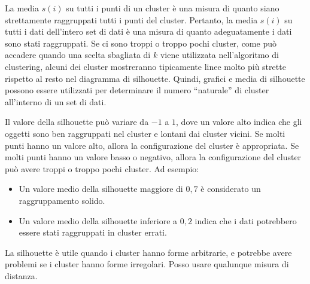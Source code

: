 La media $s(i)$ su tutti i punti di un cluster è una misura di quanto siano
strettamente raggruppati tutti i punti del cluster. Pertanto, la media $s(i)$ su
tutti i dati dell'intero set di dati è una misura di quanto adeguatamente i dati
sono stati raggruppati. Se ci sono troppi o troppo pochi cluster, come può
accadere quando una scelta sbagliata di $k$ viene utilizzata nell'algoritmo di
clustering, alcuni dei cluster mostreranno tipicamente linee molto più strette
rispetto al resto nel diagramma di silhouette. Quindi, grafici e media di
silhouette possono essere utilizzati per determinare il numero “naturale” di
cluster all'interno di un set di dati.

Il valore della silhouette può variare da $-1$ a $1$, dove un valore alto indica
che gli oggetti sono ben raggruppati nel cluster e lontani dai cluster vicini.
Se molti punti hanno un valore alto, allora la configurazione del cluster è
appropriata. Se molti punti hanno un valore basso o negativo, allora la
configurazione del cluster può avere troppi o troppo pochi cluster.
Ad esempio:
\begin{itemize}
      \item Un valore medio della silhouette maggiore di $0,7$ è considerato un
            raggruppamento solido.
      \item Un valore medio della silhouette inferiore a $0,2$ indica che i
            dati potrebbero essere stati raggruppati in cluster errati.
\end{itemize}
La silhouette è utile quando i cluster hanno forme arbitrarie, e potrebbe avere
problemi se i cluster hanno forme irregolari. Posso usare qualunque misura di
distanza.